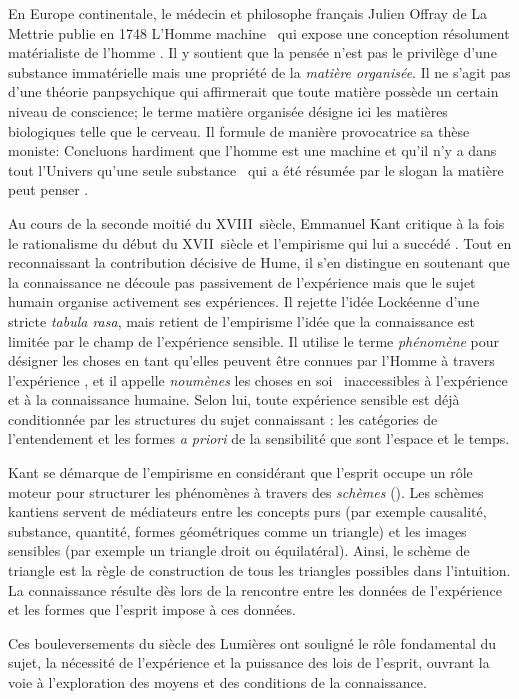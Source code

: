 En Europe continentale, le médecin et philosophe français Julien Offray de La Mettrie publie en 1748 \og L'Homme machine \fg\ qui expose une conception résolument matérialiste de l'homme \cite{la_mettrie_homme_1748}.
Il y soutient que la pensée n'est pas le privilège d'une substance immatérielle mais une propriété de la \emph{matière organisée}.
Il ne s'agit pas d'une théorie panpsychique qui affirmerait que toute matière possède un certain niveau de conscience; 
le terme matière organisée désigne ici les matières biologiques telle que le cerveau. 
Il formule de manière provocatrice sa thèse moniste: \og Concluons hardiment que l'homme est une machine et qu'il n'y a dans tout l'Univers qu'une seule substance \fg\ qui a été résumée par le slogan \og la matière peut penser \fg .

Au cours de la seconde moitié du XVIII\ieme{}~siècle, Emmanuel Kant critique à la fois le rationalisme du début du XVII\ieme{}~siècle et l'empirisme qui lui a succédé \cite{kant_kritik_1781}.
Tout en reconnaissant la contribution décisive de Hume, il s'en distingue en soutenant que la connaissance ne découle pas passivement de l'expérience mais que le sujet humain organise activement ses expériences.
Il rejette l'idée Lockéenne d'une stricte \emph{tabula rasa}, mais retient de l'empirisme l'idée que la connaissance est limitée par le champ de l'expérience sensible.
Il utilise le terme \emph{phénomène} pour désigner les \og choses en tant qu'elles peuvent être connues par l'Homme à travers l'expérience \fg, et il appelle \emph{noumènes} les \og choses en soi \fg\ inaccessibles à l'expérience et à la connaissance humaine.
Selon lui, toute expérience sensible est déjà conditionnée par les structures du sujet connaissant : les catégories de l'entendement et les formes \textit{a priori} de la sensibilité que sont l'espace et le temps.

Kant se démarque de l'empirisme en considérant que l’esprit occupe un rôle moteur pour structurer les phénomènes à travers des \emph{schèmes} ().
Les schèmes kantiens servent de médiateurs entre les concepts purs (par exemple causalité, substance, quantité, formes géométriques comme un triangle) et les images sensibles (par exemple un triangle droit ou équilatéral).
Ainsi, le schème de triangle est la règle de construction de tous les triangles possibles dans l'intuition.
La connaissance résulte dès lors de la rencontre entre les données de l’expérience et les formes que l’esprit impose à ces données.

Ces bouleversements du siècle des Lumières ont souligné le rôle fondamental du sujet, la nécessité de l’expérience et la puissance des lois de l’esprit, ouvrant la voie à l'exploration des moyens et des conditions de la connaissance.


